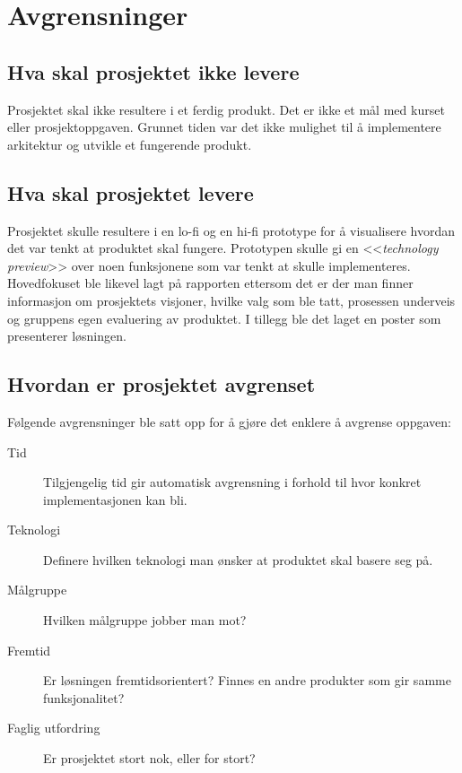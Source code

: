 \section{Avgrensninger} \label{sec:avgrensninger}

\subsection{Hva skal prosjektet ikke levere}
Prosjektet skal ikke resultere i et ferdig produkt. Det er ikke et mål med kurset eller prosjektoppgaven. Grunnet tiden var det ikke mulighet til å implementere arkitektur og utvikle et fungerende produkt.

\subsection{Hva skal prosjektet levere}
Prosjektet skulle resultere i en lo-fi og en hi-fi prototype for å visualisere hvordan det var tenkt at produktet skal fungere. Prototypen skulle gi en <<\textit{technology preview}>> over noen funksjonene som var tenkt at skulle implementeres.
Hovedfokuset ble likevel lagt på rapporten ettersom det er der man finner informasjon om prosjektets visjoner, hvilke valg som ble tatt, prosessen underveis og gruppens egen evaluering av produktet. I tillegg ble det laget en poster som presenterer løsningen.

\subsection{Hvordan er prosjektet avgrenset}
Følgende avgrensninger ble satt opp for å gjøre det enklere å avgrense oppgaven:
\begin{description}
\item[Tid] Tilgjengelig tid gir automatisk avgrensning i forhold til hvor konkret implementasjonen kan bli.
\item[Teknologi] Definere hvilken teknologi man ønsker at produktet skal basere seg på.
\item[Målgruppe] Hvilken målgruppe jobber man mot?
\item[Fremtid] Er løsningen fremtidsorientert? Finnes en andre produkter som gir samme funksjonalitet?
\item[Faglig utfordring] Er prosjektet stort nok, eller for stort?

\end{description}

